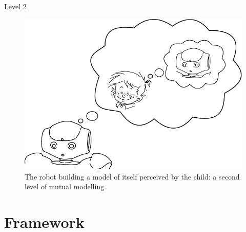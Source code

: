 \documentclass[compress]{beamer}
\begin{document}
\begin{frame}{Level 2}
    \begin{figure}
        \centering
        \includegraphics[width=0.7\columnwidth]{naoMM2}
        \caption{The robot building a model of itself perceived by the child: a second level of mutual modelling.}
    \end{figure}
\end{frame}

\section{Framework}
\end{document}
